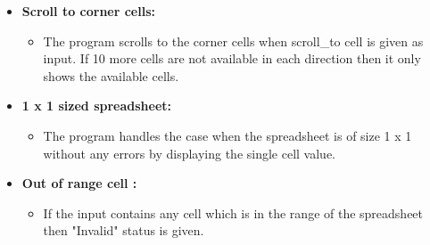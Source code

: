 \documentclass{article}
\begin{document}
\begin{itemize}
    \item \textbf{Scroll to corner cells:}
    \begin{itemize}
        \item The program scrolls to the corner cells when scroll\_to cell is given as input. If 10 more cells are not available in each direction then it only shows the available cells.
    \end{itemize}

    \item \textbf{1 x 1 sized spreadsheet:}
    \begin{itemize}
        \item The program handles the case when the spreadsheet is of size 1 x 1 without any errors by displaying the single cell value.
    \end{itemize}

    \item \textbf{Out of range cell :}
    \begin{itemize}
        \item If the input contains any cell which is in the range of the spreadsheet then "Invalid" status is given.
    \end{itemize}

\end{itemize}
\end{document}
